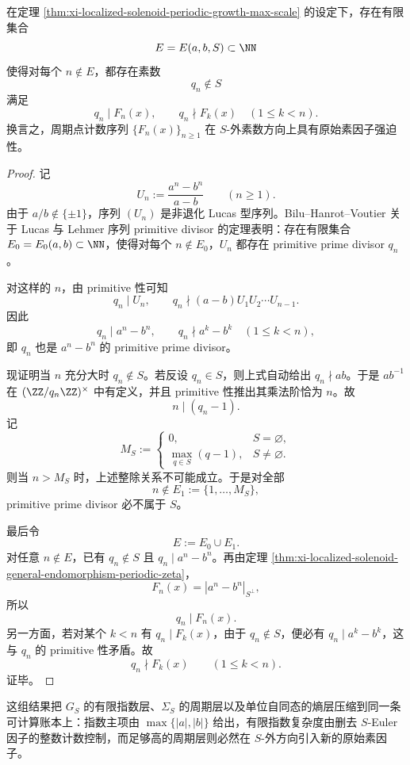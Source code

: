 \begin{theorem}\label{thm:xi-localized-solenoid-periodic-zsigmondy-forcing}
在定理 \ref{thm:xi-localized-solenoid-periodic-growth-max-scale} 的设定下，存在有限集合
\[
E=E(a,b,S)\subset \NN
\]
使得对每个 \(n\notin E\)，都存在素数
\[
q_n\notin S
\]
满足
\[
q_n\mid F_n(x),
\qquad
q_n\nmid F_k(x)\quad(1\le k<n).
\]
换言之，周期点计数序列 \(\{F_n(x)\}_{n\ge 1}\) 在 \(S\)-外素数方向上具有原始素因子强迫性。
\end{theorem}
\begin{proof}
记
\[
U_n:=\frac{a^n-b^n}{a-b}\qquad(n\ge 1).
\]
由于 \(a/b\notin\{\pm1\}\)，序列 \((U_n)\) 是非退化 Lucas 型序列。Bilu--Hanrot--Voutier 关于 Lucas 与 Lehmer 序列 primitive divisor 的定理表明：存在有限集合 \(E_0=E_0(a,b)\subset\NN\)，使得对每个 \(n\notin E_0\)，\(U_n\) 都存在 primitive prime divisor \(q_n\) \cite{BiluHanrotVoutier2001PrimitiveDivisorsLucas}。

对这样的 \(n\)，由 primitive 性可知
\[
q_n\mid U_n,
\qquad
q_n\nmid (a-b)U_1U_2\cdots U_{n-1}.
\]
因此
\[
q_n\mid a^n-b^n,
\qquad
q_n\nmid a^k-b^k\quad(1\le k<n),
\]
即 \(q_n\) 也是 \(a^n-b^n\) 的 primitive prime divisor。

现证明当 \(n\) 充分大时 \(q_n\notin S\)。若反设 \(q_n\in S\)，则上式自动给出 \(q_n\nmid ab\)。于是 \(ab^{-1}\) 在 \((\ZZ/q_n\ZZ)^\times\) 中有定义，并且 primitive 性推出其乘法阶恰为 \(n\)。故
\[
n\mid (q_n-1).
\]
记
\[
M_S:=
\begin{cases}
0,& S=\varnothing,\\
\max_{q\in S}(q-1),& S\neq\varnothing.
\end{cases}
\]
则当 \(n>M_S\) 时，上述整除关系不可能成立。于是对全部
\[
n\notin E_1:=\{1,\dots,M_S\},
\]
primitive prime divisor 必不属于 \(S\)。

最后令
\[
E:=E_0\cup E_1.
\]
对任意 \(n\notin E\)，已有 \(q_n\notin S\) 且 \(q_n\mid a^n-b^n\)。再由定理 \ref{thm:xi-localized-solenoid-general-endomorphism-periodic-zeta}，
\[
F_n(x)=|a^n-b^n|_{S^\perp},
\]
所以
\[
q_n\mid F_n(x).
\]
另一方面，若对某个 \(k<n\) 有 \(q_n\mid F_k(x)\)，由于 \(q_n\notin S\)，便必有 \(q_n\mid a^k-b^k\)，这与 \(q_n\) 的 primitive 性矛盾。故
\[
q_n\nmid F_k(x)\qquad(1\le k<n).
\]
证毕。
\end{proof}

\noindent
这组结果把 \(G_S\) 的有限指数层、\(\Sigma_S\) 的周期层以及单位自同态的熵层压缩到同一条可计算账本上：指数主项由 \(\max\{|a|,|b|\}\) 给出，有限指数复杂度由删去 \(S\)-Euler 因子的整数计数控制，而足够高的周期层则必然在 \(S\)-外方向引入新的原始素因子。

\endinput
